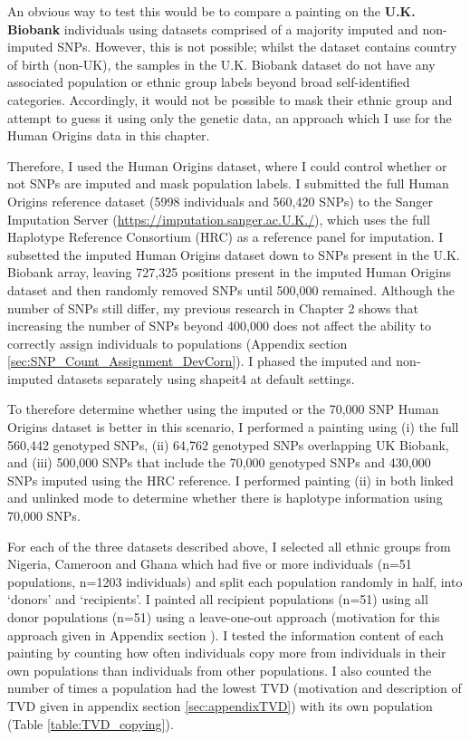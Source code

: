 An obvious way to test this would be to compare a painting on the \textbf{U.K. Biobank} individuals using datasets comprised of a majority imputed and non-imputed SNPs. However, this is not possible; whilst the dataset contains country of birth (non-UK), the samples in the U.K. Biobank dataset do not have any associated population or ethnic group labels beyond broad self-identified categories. Accordingly, it would not be possible to mask their ethnic group and attempt to guess it using only the genetic data, an approach which I use for the Human Origins data in this chapter.

Therefore, I used the Human Origins dataset, where I could control whether or not SNPs are imputed and mask population labels. I submitted the full Human Origins reference dataset (5998 individuals and 560,420 SNPs) to the Sanger Imputation Server (\url{https://imputation.sanger.ac.U.K./}), which uses the full Haplotype Reference Consortium (HRC) as a reference panel for imputation. 
I subsetted the imputed Human Origins dataset down to SNPs present in the U.K. Biobank array, leaving 727,325 positions present in the imputed Human Origins dataset and then randomly removed SNPs until 500,000 remained. Although the number of SNPs still differ, my previous research in Chapter 2 shows that increasing the number of SNPs beyond 400,000 does not affect the ability to correctly assign individuals to populations (Appendix section \ref{sec:SNP_Count_Assignment_DevCorn}). I phased the imputed and non-imputed datasets separately using shapeit4 at default settings. 

To  therefore determine whether using the imputed or the 70,000 SNP Human Origins dataset is better in this scenario, I performed a painting using (i) the full 560,442 genotyped SNPs, (ii) 64,762 genotyped SNPs overlapping UK Biobank, and (iii) 500,000 SNPs that include the 70,000 genotyped SNPs and 430,000 SNPs imputed using the HRC reference. I performed painting (ii) in both linked and unlinked mode to determine whether there is haplotype information using 70,000 SNPs.

For each of the three datasets described above, I selected all ethnic groups from Nigeria, Cameroon and Ghana which had five or more individuals (n=51 populations, n=1203 individuals) and split each population randomly in half, into `donors' and `recipients'. I painted all recipient populations (n=51) using all donor populations (n=51) using a leave-one-out approach (motivation for this approach given in Appendix section \label{sec:leave_one_out}). I tested the information content of each painting by counting how often individuals copy more from individuals in their own populations than individuals from other populations. I also counted the number of times a population had the lowest TVD (motivation and description of TVD given in appendix section \ref{sec:appendixTVD}) with its own population (Table \ref{table:TVD_copying}).

